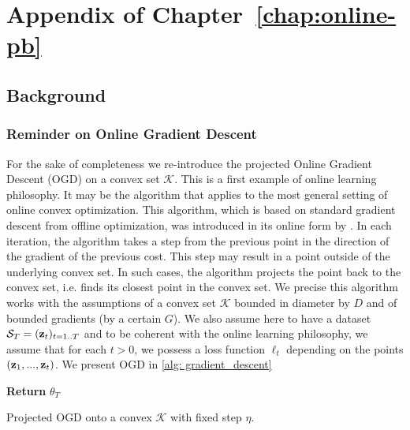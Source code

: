 \chapter{Appendix of Chapter~\ref{chap:online-pb}}
\label{ap: online-pb}
\begin{noaddcontents}


\section{Background}

\subsection{Reminder on Online Gradient Descent }
\label{sec: OGD_reminder}

For the sake of completeness we re-introduce the projected Online Gradient Descent (OGD) on a convex set $\mathcal{K}$. This is a first example of online learning philosophy. It may be the algorithm that applies to the most general setting
of online convex optimization. This algorithm,
which is based on standard gradient descent from offline optimization, was
introduced in its online form by \cite{zinkevich2003online}.
In each iteration, the algorithm takes a step from the previous point in
the direction of the gradient of the previous cost. This step may result in
a point outside of the underlying convex set. In such cases, the algorithm
projects the point back to the convex set, i.e. finds its closest point in the
convex set. We precise this algorithm works with the assumptions of a convex set $\mathcal{K}$ bounded in diameter by $D$ and of bounded gradients (by a certain $G$).
We also assume here to have a dataset $\mathcal{S}_T=(\mathbf{z}_t)_{t=1..T}$ and to be coherent with the online learning philosophy, we assume that for each $t>0$, we possess a loss function $\ell_t$ depending on the points $(\mathbf{z}_1,...,\mathbf{z}_t)$. We present OGD in \cref{alg: gradient_descent}


\begin{algorithm}[ht]
 \SetAlgoLined
\textbf{Return} $\theta_{T}$
 \caption{Projected OGD onto a convex $\mathcal{K}$ with fixed step $\eta$.}
 \label{alg: gradient_descent}
 \end{algorithm}


\end{noaddcontents}
